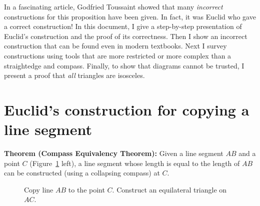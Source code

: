 In a fascinating article, Godfried Toussaint \cite{toussaint} showed that many \emph{incorrect} constructions for this proposition have been given. In fact, it was Euclid who gave a correct construction! In this document, I give a step-by-step presentation of Euclid's construction and the proof of its correctness. Then I show an incorrect construction that can be found even in modern textbooks. Next I survey constructions using tools that are more restricted or more complex than a straightedge and compass. Finally, to show that diagrams cannot be trusted, I present a proof that \emph{all} triangles are isosceles.


\section{Euclid's construction for copying a line segment}

\textbf{Theorem (Compass Equivalency Theorem):} Given a line segment $AB$ and a point $C$ (Figure~\ref{fig.ce-1} left), a line segment whose length is equal to the length of $AB$ can be constructed (using a collapsing compass) at $C$.
\begin{figure}[H]
\begin{center}
\caption{Copy line $AB$ to the point $C$. Construct an equilateral triangle on $AC$.}\label{fig.ce-1}
\end{center}
\end{figure}

